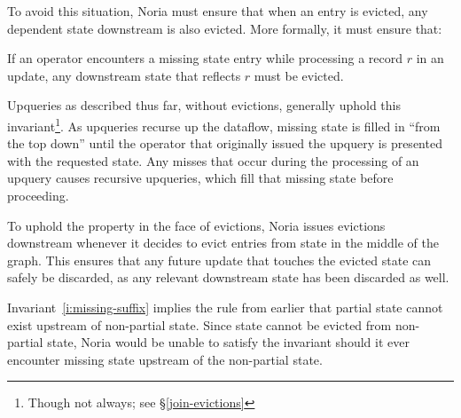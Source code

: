 To avoid this situation, Noria must ensure that when an entry is evicted, any
dependent state downstream is also evicted. More formally, it must ensure that:

\begin{invariant}
  \label{i:missing-suffix}
  If an operator encounters a missing state entry while processing a record $r$
  in an update, any downstream state that reflects $r$ must be evicted.
\end{invariant}

Upqueries as described thus far, without evictions, generally uphold this
invariant\footnote{Though not always; see \S\ref{join-evictions}}. As upqueries
recurse up the dataflow, missing state is filled in ``from the top down'' until
the operator that originally issued the upquery is presented with the requested
state. Any misses that occur during the processing of an upquery causes
recursive upqueries, which fill that missing state before proceeding.

To uphold the property in the face of evictions, Noria issues evictions
downstream whenever it decides to evict entries from state in the middle of the
graph. This ensures that any future update that touches the evicted state can
safely be discarded, as any relevant downstream state has been discarded as
well.

Invariant~\ref{i:missing-suffix} implies the rule from earlier that partial
state cannot exist upstream of non-partial state. Since state cannot be evicted
from non-partial state, Noria would be unable to satisfy the invariant should it
ever encounter missing state upstream of the non-partial state.
